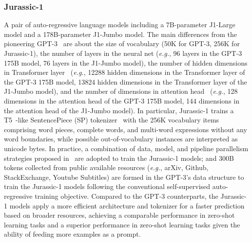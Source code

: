 \subsubsection{Jurassic-1~\cite{lieber2021jurassic}}
A pair of auto-regressive language models including a 7B-parameter J1-Large model and a 178B-parameter J1-Jumbo model. The main differences from the pioneering GPT-3~\cite{GPT-3} are about the size of vocabulary (50K for GPT-3, 256K for Jurassic-1), the number of layers in the neural net (\emph{e.g.}, 96 layers in the GPT-3 175B model, 76 layers in the J1-Jumbo model), the number of hidden dimensions in Transformer layer~\cite{Transformers} (\emph{e.g.}, 12288 hidden dimensions in the Transformer layer of the GPT-3 175B model, 13824 hidden dimensions in the Transformer layer of the J1-Jumbo model), and the number of dimensions in attention head~\cite{Transformers} (\emph{e.g.}, 128 dimensions in the attention head of the GPT-3 175B model, 144 dimensions in the attention head of the J1-Jumbo model). In particular, Jurassic-1 trains a T5~\cite{T5}-like SentencePiece (SP) tokenizer~\cite{kudo2018sentencepiece} with the 256K vocabulary items comprising word pieces, complete words, and
multi-word expressions without any word boundaries, while possible out-of-vocabulary instances are interpreted as unicode bytes. In practice, a combination of data, model, and pipeline parallelism strategies proposed in~\cite{rajbhandari2020zero} are adopted to train the Jurassic-1 models; and 300B tokens collected from public available resources (\emph{e.g.}, arXiv, Github, StackExchange, Youtube Subtitles) are formed in the GPT-3's data structure to train the Jurassic-1 models following the conventional self-supervised auto-regressive training objective. Compared to the GPT-3 counterparts, the Jurassic-1 models apply a more efficient architecture and tokenizer for a faster prediction based on broader resources, achieving a comparable performance in zero-shot learning tasks and a superior performance in zero-shot learning tasks given the ability of feeding more examples as a prompt.
